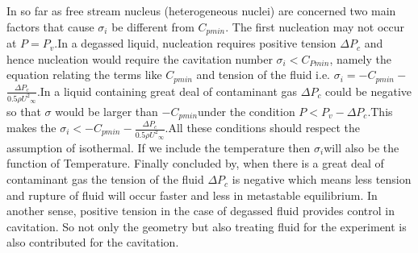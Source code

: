   In so far as free stream nucleus (heterogeneous nuclei) are concerned two main factors that cause ${\sigma}_i$ be different from $C_{pmin}$.
  The first nucleation may not occur at $P=P_v$.In a degassed liquid, nucleation requires positive tension $\Delta P_c$ and hence nucleation would require the cavitation number ${{\sigma}_i} <$$C_{Pmin}$, namely the equation relating the terms like $C_{pmin}$ and tension of the fluid i.e.
  ${{\sigma}_i}=$${-C_{pmin}}-$$\frac {{\Delta}P_c}{0.5 \rho {{{U}^2}_\infty}}$.In a liquid containing great deal of contaminant gas $\Delta P_c$ could be negative so that ${\sigma}$ would be larger than ${-C_{pmin}}$under the condition $P<{P_v}-$${\Delta}P_c$.This makes the
  ${{\sigma}_i}<$${-C_{pmin}}-$$\frac {{\Delta}P_c}{0.5 \rho {{{U}^2}_\infty}}$.All these conditions should respect the assumption of isothermal. If we include the temperature then ${\sigma}_i$will also
  be the function of Temperature. Finally concluded by, when there is a great deal of contaminant gas the tension of the fluid ${\Delta}P_c$ is negative which means less tension and rupture of fluid will
  occur faster and less in metastable equilibrium. In another sense, positive tension in the case of degassed fluid provides control in cavitation. So not only the geometry but also treating fluid for the experiment 
  is also contributed for the cavitation.

